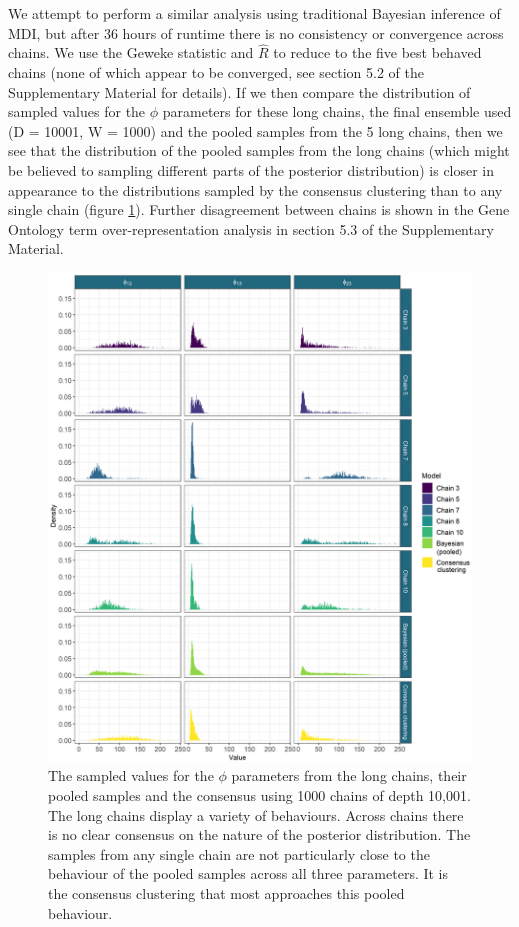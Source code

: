 \documentclass{bmcart}
\begin{document}
We attempt to perform a similar analysis using traditional Bayesian inference of MDI, but after 36 hours of runtime there is no consistency or convergence across chains.  We use the Geweke statistic and $\hat{R}$ to reduce to the five best behaved chains (none of which appear to be converged, see section 5.2 of the Supplementary Material for details). If we then compare the distribution of sampled values for the $\phi$ parameters for these long chains, the final ensemble used (D = 10001, W = 1000) and the pooled samples from the 5 long chains, then we see that the distribution of the pooled samples from the long chains (which might be believed to sampling different parts of the posterior distribution) is closer in appearance to the distributions sampled by the consensus clustering than to any single chain (figure \ref{fig:densityComparison}). Further disagreement between chains is shown in the Gene Ontology term over-representation analysis in section 5.3 of the Supplementary Material.

\begin{figure}
    \centering
    \includegraphics[scale=0.147]{./Images/Yeast/ComparisonDensitiesNoTitleEdited.png}
    \caption{The sampled values for the $\phi$ parameters from the long chains, their pooled samples and the consensus using 1000 chains of depth 10,001. The long chains display a variety of behaviours. Across chains there is no clear consensus on the nature of the posterior distribution. The samples from any single chain are not particularly close to the behaviour of the pooled samples across all three parameters. It is the consensus clustering that most approaches this pooled behaviour.}
    \label{fig:densityComparison}
\end{figure}
\end{document}
